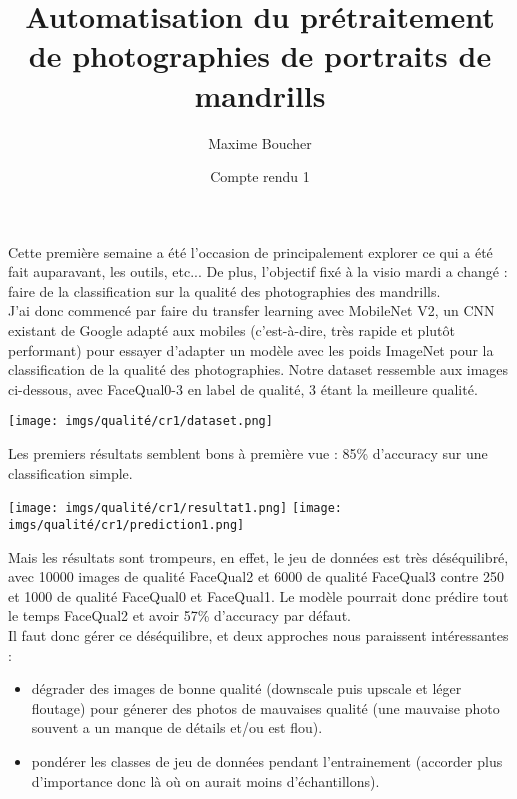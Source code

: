 \documentclass{article}
\title{Automatisation du prétraitement de photographies de portraits de mandrills}
\author{Maxime Boucher}
\date{Compte rendu 1}
\begin{document}
\maketitle

Cette première semaine a été l'occasion de principalement explorer ce qui a été fait auparavant, les outils, etc...
De plus, l'objectif fixé à la visio mardi a changé : faire de la classification sur la qualité des photographies des mandrills.\\

J'ai donc commencé par faire du transfer learning avec MobileNet V2, un CNN existant de Google adapté aux mobiles (c'est-à-dire, très rapide et plutôt performant) pour essayer d'adapter un modèle avec les poids ImageNet pour la classification de la qualité des photographies. Notre dataset ressemble aux images ci-dessous, avec FaceQual0-3 en label de qualité, 3 étant la meilleure qualité.

\begin{center}
\texttt{[image: imgs/qualité/cr1/dataset.png]}
\end{center}

Les premiers résultats semblent bons à première vue : 85\% d'accuracy sur une classification simple.

\begin{center}
\texttt{[image: imgs/qualité/cr1/resultat1.png]}
\texttt{[image: imgs/qualité/cr1/prediction1.png]}
\end{center}

Mais les résultats sont trompeurs, en effet, le jeu de données est très déséquilibré, avec 10000 images de qualité FaceQual2 et 6000 de qualité FaceQual3 contre 250 et 1000 de qualité FaceQual0 et FaceQual1. Le modèle pourrait donc prédire tout le temps FaceQual2 et avoir 57\% d'accuracy par défaut.\\

Il faut donc gérer ce déséquilibre, et deux approches nous paraissent intéressantes :\\
\begin{itemize}
    \item dégrader des images de bonne qualité (downscale puis upscale et léger floutage) pour génerer des photos de mauvaises qualité (une mauvaise photo souvent a un manque de détails et/ou est flou).
    \item pondérer les classes de jeu de données pendant l'entrainement (accorder plus d'importance donc là où on aurait moins d'échantillons).
\end{itemize}
\end{document}
